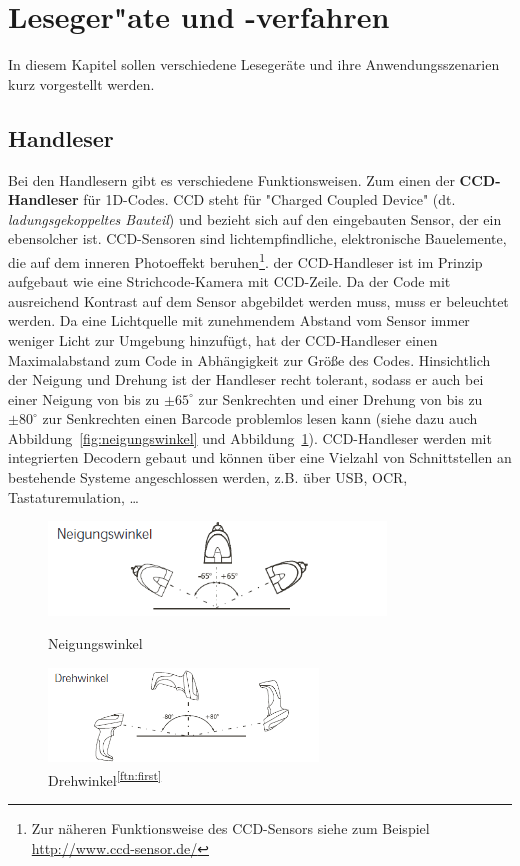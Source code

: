 \section{Leseger"ate und -verfahren}
In diesem Kapitel sollen verschiedene Lesegeräte und ihre Anwendungsszenarien kurz vorgestellt werden.

\subsection{Handleser}
Bei den Handlesern gibt es verschiedene Funktionsweisen. Zum einen der \textbf{CCD-Handleser} für 1D-Codes. CCD steht für "Charged Coupled Device" (dt. \textit{ladungsgekoppeltes Bauteil}) und bezieht sich auf den eingebauten Sensor, der ein ebensolcher ist. CCD-Sensoren sind lichtempfindliche, elektronische Bauelemente, die auf dem inneren Photoeffekt beruhen\footnote{Zur näheren Funktionsweise des CCD-Sensors siehe zum Beispiel \url{http://www.ccd-sensor.de/}}. der CCD-Handleser ist im Prinzip aufgebaut wie eine Strichcode-Kamera mit CCD-Zeile. Da der Code mit ausreichend Kontrast auf dem Sensor abgebildet werden muss, muss er beleuchtet werden. Da eine Lichtquelle mit zunehmendem Abstand vom Sensor immer weniger Licht zur Umgebung hinzufügt, hat der CCD-Handleser einen Maximalabstand zum Code in Abhängigkeit zur Größe des Codes. Hinsichtlich der Neigung und Drehung ist der Handleser recht tolerant, sodass er auch bei einer Neigung von bis zu $\pm65^\circ$ zur Senkrechten und einer Drehung von bis zu $\pm80^\circ$ zur Senkrechten einen Barcode problemlos lesen kann (siehe dazu auch Abbildung~\ref{fig:neigungswinkel} und Abbildung~\ref{fig:drehwinkel}). CCD-Handleser werden mit integrierten Decodern gebaut und können über eine Vielzahl von Schnittstellen an bestehende Systeme angeschlossen werden, z.B. über USB, OCR, Tastaturemulation, \dots \\

\begin{figure}[htbp]
	\parbox{.47\textwidth}
	{
		\centering
		\includegraphics[height=2.5cm]{Bilder/Neigungswinkel.png}
		\caption[Neigungswinkel]{Neigungswinkel\footnotemark}
		\label{fig:neigungswinkel}
	}
	\hfill
	\parbox{.47\textwidth}
	{
		\centering
		\includegraphics[height=2.5cm]{Bilder/Drehwinkel.png}
		\caption[Drehwinkel]{Drehwinkel\textsuperscript{\ref{ftn:first}}}
		\label{fig:drehwinkel}
	}
	\hfill
\end{figure}


